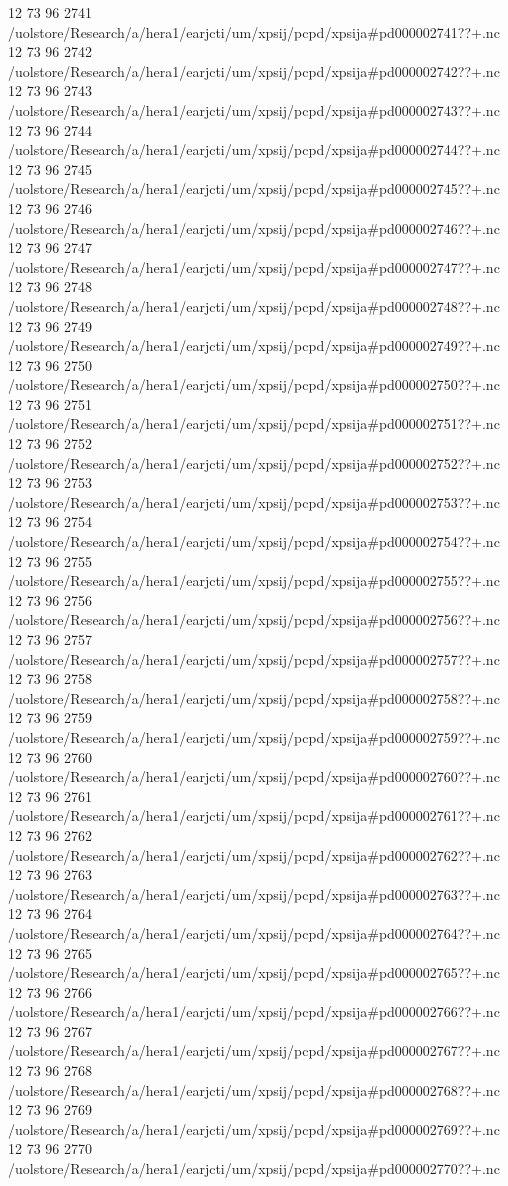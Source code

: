 12 73 96
2741
/uolstore/Research/a/hera1/earjcti/um/xpsij/pcpd/xpsija#pd000002741??+.nc
12 73 96
2742
/uolstore/Research/a/hera1/earjcti/um/xpsij/pcpd/xpsija#pd000002742??+.nc
12 73 96
2743
/uolstore/Research/a/hera1/earjcti/um/xpsij/pcpd/xpsija#pd000002743??+.nc
12 73 96
2744
/uolstore/Research/a/hera1/earjcti/um/xpsij/pcpd/xpsija#pd000002744??+.nc
12 73 96
2745
/uolstore/Research/a/hera1/earjcti/um/xpsij/pcpd/xpsija#pd000002745??+.nc
12 73 96
2746
/uolstore/Research/a/hera1/earjcti/um/xpsij/pcpd/xpsija#pd000002746??+.nc
12 73 96
2747
/uolstore/Research/a/hera1/earjcti/um/xpsij/pcpd/xpsija#pd000002747??+.nc
12 73 96
2748
/uolstore/Research/a/hera1/earjcti/um/xpsij/pcpd/xpsija#pd000002748??+.nc
12 73 96
2749
/uolstore/Research/a/hera1/earjcti/um/xpsij/pcpd/xpsija#pd000002749??+.nc
12 73 96
2750
/uolstore/Research/a/hera1/earjcti/um/xpsij/pcpd/xpsija#pd000002750??+.nc
12 73 96
2751
/uolstore/Research/a/hera1/earjcti/um/xpsij/pcpd/xpsija#pd000002751??+.nc
12 73 96
2752
/uolstore/Research/a/hera1/earjcti/um/xpsij/pcpd/xpsija#pd000002752??+.nc
12 73 96
2753
/uolstore/Research/a/hera1/earjcti/um/xpsij/pcpd/xpsija#pd000002753??+.nc
12 73 96
2754
/uolstore/Research/a/hera1/earjcti/um/xpsij/pcpd/xpsija#pd000002754??+.nc
12 73 96
2755
/uolstore/Research/a/hera1/earjcti/um/xpsij/pcpd/xpsija#pd000002755??+.nc
12 73 96
2756
/uolstore/Research/a/hera1/earjcti/um/xpsij/pcpd/xpsija#pd000002756??+.nc
12 73 96
2757
/uolstore/Research/a/hera1/earjcti/um/xpsij/pcpd/xpsija#pd000002757??+.nc
12 73 96
2758
/uolstore/Research/a/hera1/earjcti/um/xpsij/pcpd/xpsija#pd000002758??+.nc
12 73 96
2759
/uolstore/Research/a/hera1/earjcti/um/xpsij/pcpd/xpsija#pd000002759??+.nc
12 73 96
2760
/uolstore/Research/a/hera1/earjcti/um/xpsij/pcpd/xpsija#pd000002760??+.nc
12 73 96
2761
/uolstore/Research/a/hera1/earjcti/um/xpsij/pcpd/xpsija#pd000002761??+.nc
12 73 96
2762
/uolstore/Research/a/hera1/earjcti/um/xpsij/pcpd/xpsija#pd000002762??+.nc
12 73 96
2763
/uolstore/Research/a/hera1/earjcti/um/xpsij/pcpd/xpsija#pd000002763??+.nc
12 73 96
2764
/uolstore/Research/a/hera1/earjcti/um/xpsij/pcpd/xpsija#pd000002764??+.nc
12 73 96
2765
/uolstore/Research/a/hera1/earjcti/um/xpsij/pcpd/xpsija#pd000002765??+.nc
12 73 96
2766
/uolstore/Research/a/hera1/earjcti/um/xpsij/pcpd/xpsija#pd000002766??+.nc
12 73 96
2767
/uolstore/Research/a/hera1/earjcti/um/xpsij/pcpd/xpsija#pd000002767??+.nc
12 73 96
2768
/uolstore/Research/a/hera1/earjcti/um/xpsij/pcpd/xpsija#pd000002768??+.nc
12 73 96
2769
/uolstore/Research/a/hera1/earjcti/um/xpsij/pcpd/xpsija#pd000002769??+.nc
12 73 96
2770
/uolstore/Research/a/hera1/earjcti/um/xpsij/pcpd/xpsija#pd000002770??+.nc
